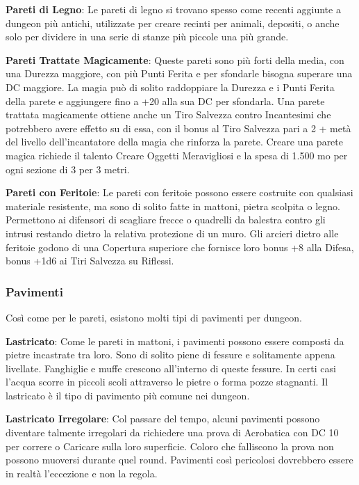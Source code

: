\begin{multicols}{2}

\textbf{Pareti di Legno}: Le pareti di legno si trovano spesso come recenti aggiunte a dungeon più antichi, utilizzate per creare recinti per animali, depositi, o anche solo per dividere in una serie di stanze più piccole una più grande.

\textbf{Pareti Trattate Magicamente}: Queste pareti sono più forti della media, con una Durezza maggiore, con più Punti Ferita e per sfondarle bisogna superare una DC maggiore. La magia può di solito raddoppiare la Durezza e i Punti Ferita della parete e aggiungere fino a +20 alla sua DC per sfondarla. Una parete trattata magicamente ottiene anche un Tiro Salvezza contro Incantesimi che potrebbero avere effetto su di essa, con il bonus al Tiro Salvezza pari a 2 + metà del livello dell'incantatore della magia che rinforza la parete. Creare una parete magica richiede il talento Creare Oggetti Meravigliosi e la spesa di 1.500 mo per ogni sezione di 3 per 3 metri.

\textbf{Pareti con Feritoie}: Le pareti con feritoie possono essere costruite con qualsiasi materiale resistente, ma sono di solito fatte in mattoni, pietra scolpita o legno. Permettono ai difensori di scagliare frecce o quadrelli da balestra contro gli intrusi restando dietro la relativa protezione di un muro. Gli arcieri dietro alle feritoie godono di una Copertura superiore che fornisce loro bonus +8 alla Difesa, bonus +1d6 ai Tiri Salvezza su Riflessi.

\subsubsection{Pavimenti}

Così come per le pareti, esistono molti tipi di pavimenti per dungeon.

\textbf{Lastricato}: Come le pareti in mattoni, i pavimenti possono essere composti da pietre incastrate tra loro. Sono di solito piene di fessure e solitamente appena livellate. Fanghiglie e muffe crescono all'interno di queste fessure. In certi casi l'acqua scorre in piccoli scoli attraverso le pietre o forma pozze stagnanti. Il lastricato è il tipo di pavimento più comune nei dungeon.

\textbf{Lastricato Irregolare}: Col passare del tempo, alcuni pavimenti possono diventare talmente irregolari da richiedere una prova di Acrobatica con DC 10 per correre o Caricare sulla loro superficie. Coloro che falliscono la prova non possono muoversi durante quel round. Pavimenti così pericolosi dovrebbero essere in realtà l'eccezione e non la regola.


\end{multicols}
